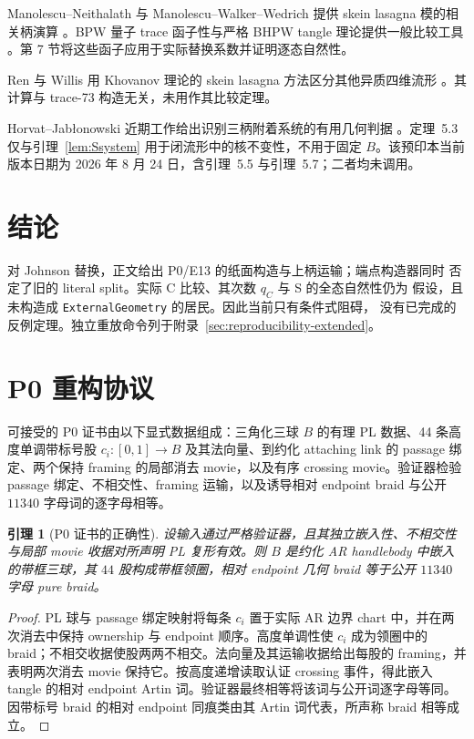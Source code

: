 \documentclass[11pt]{amsart}
\newtheorem{lemma}[theorem]{引理}
\theoremstyle{definition}
\theoremstyle{remark}
\begin{document}
Manolescu--Neithalath 与 Manolescu--Walker--Wedrich 提供 skein lasagna 模的相关柄演算 \cite{ManolescuNeithalath2020,ManolescuWalkerWedrich2023}。BPW 量子 trace 函子性与严格 BHPW tangle 理论提供一般比较工具 \cite{BeliakovaPutyraWehrli2019,BeliakovaHogancampPutyraWehrli2023}。第 7 节将这些函子应用于实际替换系数并证明逐态自然性。

Ren 与 Willis 用 Khovanov 理论的 skein lasagna 方法区分其他异质四维流形 \cite{RenWillis2024}。其计算与 trace-73 构造无关，未用作其比较定理。

Horvat--Jab\l{}onowski 近期工作给出识别三柄附着系统的有用几何判据 \cite{HorvatJablonowski2025}。定理~5.3 仅与引理~\ref{lem:Ssystem} 用于闭流形中的核不变性，不用于固定 $B$。该预印本当前版本日期为 2026 年 8 月 24 日，含引理~5.5 与引理~5.7；二者均未调用。
\section{结论}

对 Johnson 替换，正文给出 P0/E13 的纸面构造与上柄运输；端点构造器同时
否定了旧的 literal split。实际 C 比较、其次数 $q_C$ 与 S 的全态自然性仍为
假设，且未构造成 \texttt{ExternalGeometry} 的居民。因此当前只有条件式阻碍，
没有已完成的反例定理。独立重放命令列于附录~\ref{sec:reproducibility-extended}。
\appendix


\section{P0 重构协议}\label{app:p0-reconstruction}

可接受的 P0 证书由以下显式数据组成：三角化三球 $B$ 的有理 PL 数据、44 条高度单调带标号股 $c_i:[0,1]\to B$ 及其法向量、到约化 attaching link 的 passage 绑定、两个保持 framing 的局部消去 movie，以及有序 crossing movie。验证器检验 passage 绑定、不相交性、framing 运输，以及诱导相对 endpoint braid 与公开 $11340$ 字母词的逐字母相等。

\begin{lemma}[P0 证书的正确性]
设输入通过严格验证器，且其独立嵌入性、不相交性与局部 movie 收据对所声明 PL 复形有效。则 $B$ 是约化 AR handlebody 中嵌入的带框三球，其 $44$ 股构成带框领圈，相对 endpoint 几何 braid 等于公开 $11340$ 字母 pure braid。
\end{lemma}

\begin{proof}
PL 球与 passage 绑定映射将每条 $c_i$ 置于实际 AR 边界 chart 中，并在两次消去中保持 ownership 与 endpoint 顺序。高度单调性使 $c_i$ 成为领圈中的 braid；不相交收据使股两两不相交。法向量及其运输收据给出每股的 framing，并表明两次消去 movie 保持它。按高度递增读取认证 crossing 事件，得此嵌入 tangle 的相对 endpoint Artin 词。验证器最终相等将该词与公开词逐字母等同。因带标号 braid 的相对 endpoint 同痕类由其 Artin 词代表，所声称 braid 相等成立。
\end{proof}
\end{document}

